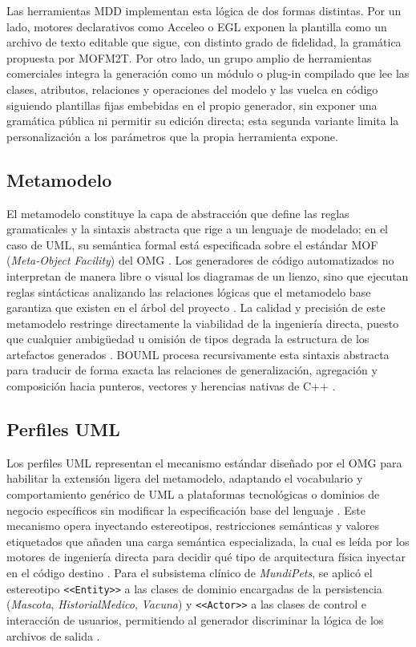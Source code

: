 \documentclass[journal,onecolumn]{IEEEtran}
\begin{document}
	Las herramientas MDD implementan esta lógica de dos formas distintas. Por un lado, motores declarativos como Acceleo o EGL exponen la plantilla como un archivo de texto editable que sigue, con distinto grado de fidelidad, la gramática propuesta por MOFM2T. Por otro lado, un grupo amplio de herramientas comerciales integra la generación como un módulo o plug-in compilado que lee las clases, atributos, relaciones y operaciones del modelo y las vuelca en código siguiendo plantillas fijas embebidas en el propio generador, sin exponer una gramática pública ni permitir su edición directa; esta segunda variante limita la personalización a los parámetros que la propia herramienta expone.
	
	\subsection{Metamodelo}
	El metamodelo constituye la capa de abstracción que define las reglas gramaticales y la sintaxis abstracta que rige a un lenguaje de modelado; en el caso de UML, su semántica formal está especificada sobre el estándar MOF (\textit{Meta-Object Facility}) del OMG \cite{OMG2017UML}. Los generadores de código automatizados no interpretan de manera libre o visual los diagramas de un lienzo, sino que ejecutan reglas sintácticas analizando las relaciones lógicas que el metamodelo base garantiza que existen en el árbol del proyecto \cite{DiFelice2022}. La calidad y precisión de este metamodelo restringe directamente la viabilidad de la ingeniería directa, puesto que cualquier ambigüedad u omisión de tipos degrada la estructura de los artefactos generados \cite{DiRocco2022}. BOUML procesa recursivamente esta sintaxis abstracta para traducir de forma exacta las relaciones de generalización, agregación y composición hacia punteros, vectores y herencias nativas de C++ \cite{BOUMLFeatures2026}.
	
	\subsection{Perfiles UML}
	Los perfiles UML representan el mecanismo estándar diseñado por el OMG para habilitar la extensión ligera del metamodelo, adaptando el vocabulario y comportamiento genérico de UML a plataformas tecnológicas o dominios de negocio específicos sin modificar la especificación base del lenguaje \cite{OMG2017UML}. Este mecanismo opera inyectando estereotipos, restricciones semánticas y valores etiquetados que añaden una carga semántica especializada, la cual es leída por los motores de ingeniería directa para decidir qué tipo de arquitectura física inyectar en el código destino \cite{Kraas2022, Gorski2022}. Para el subsistema clínico de \textit{MundiPets}, se aplicó el estereotipo \texttt{<<Entity>>} a las clases de dominio encargadas de la persistencia (\textit{Mascota}, \textit{HistorialMedico}, \textit{Vacuna}) y \texttt{<<Actor>>} a las clases de control e interacción de usuarios, permitiendo al generador discriminar la lógica de los archivos de salida \cite{ERSMundiPets2026, BOUMLFeatures2026}.
	
\end{document}

